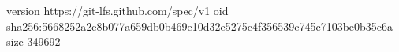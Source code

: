 version https://git-lfs.github.com/spec/v1
oid sha256:5668252a2e8b077a659db0b469e10d32e5275c4f356539c745c7103be0b35c6a
size 349692
